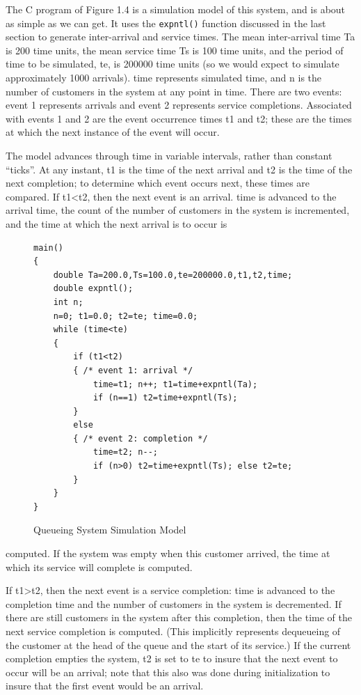 The C program of Figure 1.4 is a simulation model of this system, and is about
as simple as we can get. It uses the \texttt{expntl()} function discussed in the last
section to generate inter-arrival and service times. The mean inter-arrival
time Ta is 200 time units, the mean service time Ts is 100 time units, and the
period of time to be simulated, te, is 200000 time units (so we would expect to
simulate approximately 1000 arrivals). time represents simulated time, and n
is the number of customers in the system at any point in time. There are two
events: event 1 represents arrivals and event 2 represents service completions.
Associated with events 1 and 2 are the event occurrence times t1 and t2; these
are the times at which the next instance of the event will occur.

The model advances through time in variable intervals, rather than constant
``ticks''. At any instant, t1 is the time of the next arrival and t2 is the time
of the next completion; to determine which event occurs next, these times are
compared. If t1<t2, then the next event is an arrival. time is advanced to the
arrival time, the count of the number of customers in the system is incremented,
and the time at which the next arrival is to occur is

\begin{figure}[H]
\centering
\begin{minipage}{.95\textwidth}
\begin{verbatim}
main()
{
    double Ta=200.0,Ts=100.0,te=200000.0,t1,t2,time;
    double expntl();
    int n;
    n=0; t1=0.0; t2=te; time=0.0;
    while (time<te)
    {
        if (t1<t2)
        { /* event 1: arrival */
            time=t1; n++; t1=time+expntl(Ta);
            if (n==1) t2=time+expntl(Ts);
        }
        else
        { /* event 2: completion */
            time=t2; n--;
            if (n>0) t2=time+expntl(Ts); else t2=te;
        }
    }
}
\end{verbatim}
\end{minipage}
\caption{Queueing System Simulation Model}
\end{figure}
\noindent computed. If the system was empty when this customer arrived, the time at
which its service will complete is computed.

If t1>t2, then the next event is a service completion: time is advanced to the
completion time and the number of customers in the system is decremented. If
there are still customers in the system after this completion, then the time of
the next service completion is computed. (This implicitly represents dequeueing
of the customer at the head of the queue and the start of its service.) If the
current completion empties the system, t2 is set to te to insure that the next
event to occur will be an arrival; note that this also was done during
initialization to insure that the first event would be an arrival.

